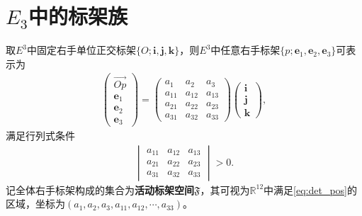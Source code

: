 \documentclass[../../main.tex]{subfiles}%
\begin{document}
\section{$E_3$中的标架族}

\begin{definition}
取$E^3$中固定右手单位正交标架$\{O;\boldsymbol{i},\boldsymbol{j},\boldsymbol{k}\}$，则$E^3$中任意右手标架$\{p;\boldsymbol{e}_1,\boldsymbol{e}_2,\boldsymbol{e}_3\}$可表示为
\begin{align}
\begin{pmatrix}
\overrightarrow{Op}\\
\boldsymbol{e}_1\\
\boldsymbol{e}_2\\
\boldsymbol{e}_3
\end{pmatrix}
=
\begin{pmatrix}
a_1 & a_2 & a_3\\
a_{11} & a_{12} & a_{13}\\
a_{21} & a_{22} & a_{23}\\
a_{31} & a_{32} & a_{33}
\end{pmatrix}
\begin{pmatrix}
\boldsymbol{i}\\
\boldsymbol{j}\\
\boldsymbol{k}
\end{pmatrix},
\label{eq:frame_rep}
\end{align}
满足行列式条件
\begin{align}
\begin{vmatrix}
a_{11} & a_{12} & a_{13}\\
a_{21} & a_{22} & a_{23}\\
a_{31} & a_{32} & a_{33}
\end{vmatrix}
>0.
\label{eq:det_pos}
\end{align}
记全体右手标架构成的集合为\textbf{活动标架空间}$\mathfrak{F}$，其可视为$\mathbb{R}^{12}$中满足\eqref{eq:det_pos}的区域，坐标为$(a_1,a_2,a_3,a_{11},a_{12},\cdots,a_{33})$。


\end{definition}
\end{document}
